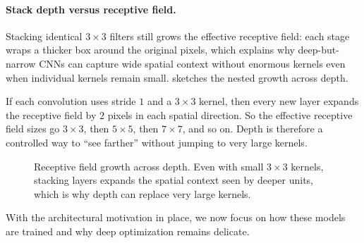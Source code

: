 \paragraph{Stack depth versus receptive field.} Stacking identical \(3\times3\) filters still grows the effective receptive field: each stage wraps a thicker box around the original pixels, which explains why deep-but-narrow CNNs can capture wide spatial context without enormous kernels even when individual kernels remain small.  sketches the nested growth across depth.

\begin{tcolorbox}[summarybox, title={Quick check: receptive field growth for stacked \(3\times3\)}]
If each convolution uses stride \(1\) and a \(3\times3\) kernel, then every new layer expands the receptive field by \(2\) pixels in each spatial direction. So the effective receptive field sizes go \(3\times3\), then \(5\times5\), then \(7\times7\), and so on. Depth is therefore a controlled way to ``see farther'' without jumping to very large kernels.
\end{tcolorbox}


\begin{figure}[t]
    \centering
    \caption{Receptive field growth across depth. Even with small \(3\times3\) kernels, stacking layers expands the spatial context seen by deeper units, which is why depth can replace very large kernels.}
    \label{fig:cnn_receptive_field_growth}
\end{figure}

With the architectural motivation in place, we now focus on how these models are trained and why deep optimization remains delicate.

